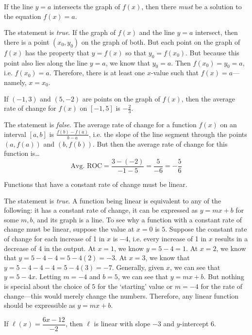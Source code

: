 \documentclass[11pt,letterpaper]{article}
\begin{document}
 If the line $y= a$ intersects the graph of $f(x)$, then there \textit{must} be a solution to the equation $f(x)= a$. \pspace

\sol The statement is \textit{true}. If the graph of $f(x)$ and the line $y= a$ intersect, then there is a point $(x_0, y_0)$ on the graph of both. But each point on the graph of $f(x)$ has the property that $y= f(x)$ so that $y_0= f(x_0)$. But because this point also lies along the line $y= a$, we know that $y_0= a$. Then $f(x_0)= y_0= a$, i.e. $f(x_0)= a$. Therefore, there is at least one $x$-value such that $f(x)= a$---namely, $x= x_0$. \pvspace{1.3cm}



 If $(-1, 3)$ and $(5, -2)$ are points on the graph of $f(x)$, then the average rate of change for $f(x)$ on $[-1, 5]$ is $-\frac{2}{3}$. \pspace

\sol The statement is \textit{false}. The average rate of change for a function $f(x)$ on an interval $[a, b]$ is $\frac{f(b) - f(a)}{b - a}$, i.e. the slope of the line segment through the points $(a, f(a))$ and $(b, f(b))$. But then the average rate of change for this function is\dots
	\[
	\text{Avg. ROC}= \dfrac{3 - (-2)}{-1 - 5}= \dfrac{5}{-6}= -\dfrac{5}{6}
	\] \pvspace{1.3cm}



 Functions that have a constant rate of change must be linear. \pspace

\sol The statement is \textit{true}. A function being linear is equivalent to any of the following: it has a constant rate of change, it can be expressed as $y= mx + b$ for some $m, b$, and its graph is a line. To see why a function with a constant rate of change must be linear, suppose the value at $x= 0$ is $5$. Suppose the constant rate of change for each increase of 1 in $x$ is $-4$, i.e. every increase of 1 in $x$ results in a decrease of 4 in the output. At $x= 1$, we know $y= 5 - 4= 1$. At $x= 2$, we know that $y= 5 - 4 - 4= 5 - 4(2)= -3$. At $x= 3$, we know that $y= 5 - 4 - 4 - 4= 5 - 4(3)= -7$. Generally, given $x$, we can see that $y= 5 - 4x$. Letting $m= -4$ and $b= 5$, we can see that $y= mx + b$. But nothing is special about the choice of $5$ for the `starting' value or $m= -4$ for the rate of change---this would merely change the numbers. Therefore, any linear function should be expressible as $y= mx + b$. \pvspace{1.3cm}



 If $\ell(x)= \dfrac{6x - 12}{-2}$, then $\ell$ is linear with slope $-3$ and $y$-intercept $6$. \pspace
\end{document}
